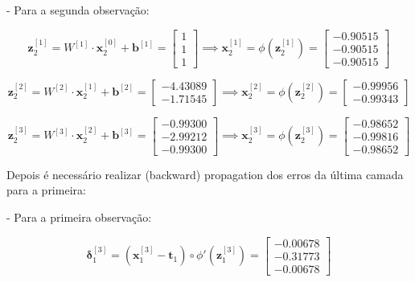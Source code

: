 \documentclass[a4paper,12pt]{article} %
\begin{document}
\begin{enumerate}
- Para a segunda observação:

\begin{equation*}
    \textbf{z}^{[1]}_2 = W^{[1]} \cdot \textbf{x}^{[0]}_2 + \textbf{b}^{[1]} = \begin{bmatrix} 1 \\ 1 \\ 1 \end{bmatrix} \implies \textbf{x}^{[1]}_2 = \phi(\textbf{z}^{[1]}_2)= \begin{bmatrix} -0.90515 \\ -0.90515 \\ -0.90515 \end{bmatrix}
\end{equation*}

\begin{equation*}
    \textbf{z}^{[2]}_2 = W^{[2]} \cdot \textbf{x}^{[1]}_2 + \textbf{b}^{[2]} = \begin{bmatrix} -4.43089 \\ -1.71545 \end{bmatrix} \implies \textbf{x}^{[2]}_2 = \phi(\textbf{z}^{[2]}_2)= \begin{bmatrix} -0.99956 \\ -0.99343 \end{bmatrix}
\end{equation*}

\begin{equation*}
    \textbf{z}^{[3]}_2 = W^{[3]} \cdot \textbf{x}^{[2]}_2 + \textbf{b}^{[3]} = \begin{bmatrix} -0.99300 \\ -2.99212 \\ -0.99300 \end{bmatrix} \implies \textbf{x}^{[3]}_2 = \phi(\textbf{z}^{[3]}_2)= \begin{bmatrix} -0.98652 \\ -0.99816\\ -0.98652 \end{bmatrix}
\end{equation*}

Depois é necessário realizar (backward) propagation dos erros da última camada para a primeira:

- Para a primeira observação:

\begin{equation*}
    \bm{\delta}^{[3]}_1 = (\textbf{x}^{[3]}_1 - \textbf{t}_1) \circ \phi'(\textbf{z}^{[3]}_1) = \begin{bmatrix} -0.00678\\ -0.31773 \\ -0.00678 \end{bmatrix}
\end{equation*}


\end{enumerate}
\end{document}
